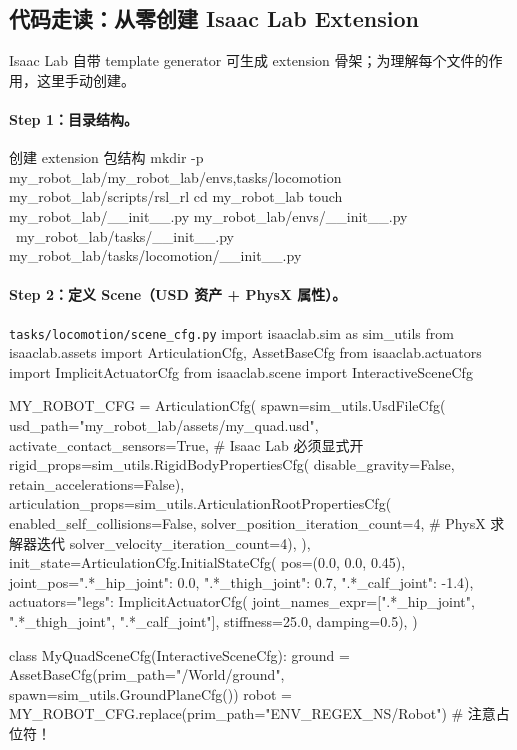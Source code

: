 \subsection{代码走读：从零创建 Isaac Lab Extension}
\label{sec:rlmc-diy-isaac-create}

Isaac Lab 自带 template generator 可生成 extension 骨架；为理解每个文件的作用，这里手动创建。

\paragraph{Step 1：目录结构。}

\begin{codebox}[bash]{创建 extension 包结构}
mkdir -p my_robot_lab/my_robot_lab/{envs,tasks/locomotion} my_robot_lab/scripts/rsl_rl
cd my_robot_lab
touch my_robot_lab/__init__.py my_robot_lab/envs/__init__.py \
      my_robot_lab/tasks/__init__.py my_robot_lab/tasks/locomotion/__init__.py
\end{codebox}

\paragraph{Step 2：定义 Scene（USD 资产 + PhysX 属性）。}

\begin{codebox}[Python]{\texttt{tasks/locomotion/scene\_cfg.py}}
import isaaclab.sim as sim_utils
from isaaclab.assets import ArticulationCfg, AssetBaseCfg
from isaaclab.actuators import ImplicitActuatorCfg
from isaaclab.scene import InteractiveSceneCfg

MY_ROBOT_CFG = ArticulationCfg(
    spawn=sim_utils.UsdFileCfg(
        usd_path="my_robot_lab/assets/my_quad.usd",
        activate_contact_sensors=True,                # Isaac Lab 必须显式开
        rigid_props=sim_utils.RigidBodyPropertiesCfg(
            disable_gravity=False, retain_accelerations=False),
        articulation_props=sim_utils.ArticulationRootPropertiesCfg(
            enabled_self_collisions=False,
            solver_position_iteration_count=4,        # PhysX 求解器迭代
            solver_velocity_iteration_count=4),
    ),
    init_state=ArticulationCfg.InitialStateCfg(
        pos=(0.0, 0.0, 0.45),
        joint_pos={".*_hip_joint": 0.0, ".*_thigh_joint": 0.7, ".*_calf_joint": -1.4}),
    actuators={"legs": ImplicitActuatorCfg(
        joint_names_expr=[".*_hip_joint", ".*_thigh_joint", ".*_calf_joint"],
        stiffness=25.0, damping=0.5)},
)

class MyQuadSceneCfg(InteractiveSceneCfg):
    ground = AssetBaseCfg(prim_path="/World/ground", spawn=sim_utils.GroundPlaneCfg())
    robot  = MY_ROBOT_CFG.replace(prim_path="{ENV_REGEX_NS}/Robot")  # 注意占位符！
\end{codebox}

